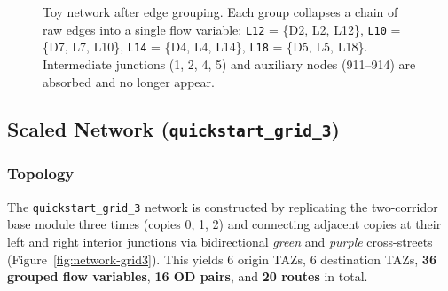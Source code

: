 \documentclass[11pt]{article}
\begin{document}
\begin{figure}[h]
\centering
{}
\caption{Toy network after edge grouping. Each group collapses a chain of raw edges
into a single flow variable: \texttt{L12} = \{D2, L2, L12\}, \texttt{L10} = \{D7, L7, L10\},
\texttt{L14} = \{D4, L4, L14\}, \texttt{L18} = \{D5, L5, L18\}.
Intermediate junctions (1, 2, 4, 5) and auxiliary nodes (911--914) are absorbed
and no longer appear.}
\label{fig:network_toy}
\end{figure}


\subsection{Scaled Network (\texttt{quickstart\_grid\_3})}
\label{app:network_grid3}

\subsubsection*{Topology}

The \texttt{quickstart\_grid\_3} network is constructed by replicating the
two-corridor base module three times (copies 0, 1, 2) and connecting adjacent
copies at their left and right interior junctions via bidirectional
\emph{green} and \emph{purple} cross-streets
(Figure~\ref{fig:network-grid3}). This yields 6 origin TAZs, 6 destination
TAZs, \textbf{36 grouped flow variables}, \textbf{16 OD pairs}, and
\textbf{20 routes} in total.
\end{document}
